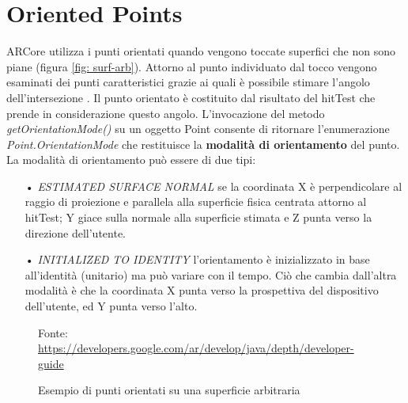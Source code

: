 \documentclass[crop=false, class=book]{standalone}
\begin{document}
		
	\chapter{Oriented Points}
	
		ARCore utilizza i punti orientati quando vengono toccate superfici che non sono piane (figura \vref{fig: surf-arb}). Attorno al punto individuato dal tocco vengono esaminati dei punti caratteristici grazie ai quali è possibile stimare l'angolo dell'intersezione \cite{anna2018arcoredetection}. Il punto orientato è costituito dal risultato del hitTest che prende in considerazione questo angolo. 
		L'invocazione del metodo \emph{getOrientationMode()} su un oggetto Point consente di ritornare l'enumerazione \emph{Point.OrientationMode} che restituisce la \textbf{modalità di orientamento} del punto.\\
		La modalità di orientamento può essere di due tipi:
		\begin{itemize}
			\item[•] \emph{ESTIMATED SURFACE NORMAL} se la coordinata X è perpendicolare al raggio di proiezione e parallela alla superficie fisica centrata attorno al hitTest; Y giace sulla normale alla superficie stimata e Z punta verso la direzione dell'utente.
			\item[•] \emph{INITIALIZED TO IDENTITY} l'orientamento è inizializzato in base all'identità (unitario) ma può variare con il tempo. Ciò che cambia dall'altra modalità è che la coordinata X punta verso la prospettiva del dispositivo dell'utente, ed Y punta verso l'alto.
		\end{itemize}
		
				
		\begin{figure}
				\centering
				{Fonte: \url{https://developers.google.com/ar/develop/java/depth/developer-guide}}
				\caption{Esempio di punti orientati su una superficie arbitraria}
				\label{fig: surf-arb}
		\end{figure}
		
		
\end{document}
